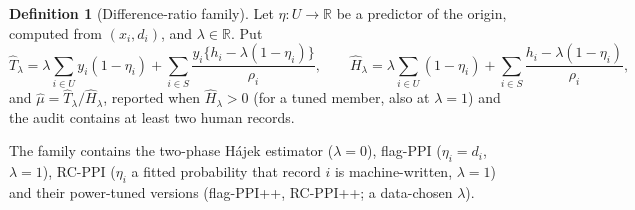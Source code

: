 \documentclass[11pt]{article}
\theoremstyle{definition}
\newtheorem{definition}{Definition}
\begin{document}
\begin{definition}[Difference-ratio family]\label{d:family}
Let $\eta:U\to\mathbb{R}$ be a predictor of the origin, computed from $(x_i,d_i)$, and
$\lambda\in\mathbb{R}$. Put
\begin{equation}\label{eq:family}
\hat T_\lambda=\lambda\sum_{i\in U}y_i(1-\eta_i)+\sum_{i\in S}\frac{y_i\{h_i-\lambda(1-\eta_i)\}}{\rho_i},
\qquad
\hat H_\lambda=\lambda\sum_{i\in U}(1-\eta_i)+\sum_{i\in S}\frac{h_i-\lambda(1-\eta_i)}{\rho_i},
\end{equation}
and $\hat\mu=\hat T_\lambda/\hat H_\lambda$, reported when $\hat H_\lambda>0$ (for a tuned member, also at $\lambda=1$) and the audit
contains at least two human records.
\end{definition}
The family contains the two-phase H\'ajek estimator ($\lambda=0$), flag-PPI
($\eta_i=d_i$, $\lambda=1$), RC-PPI ($\eta_i$ a fitted probability that record $i$ is
machine-written, $\lambda=1$) and their power-tuned versions (flag-PPI++, RC-PPI++; a
data-chosen $\lambda$).
\end{document}
